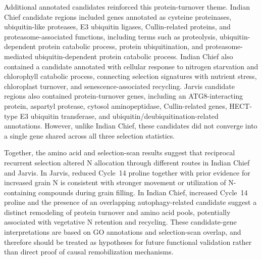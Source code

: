 \documentclass[pdflatex,sn-mathphys-num]{sn-jnl}%
\theoremstyle{thmstyleone}%
\theoremstyle{thmstyletwo}%
\theoremstyle{thmstylethree}%
\begin{document}
Additional annotated candidates reinforced this protein-turnover theme. Indian Chief candidate regions included genes annotated as cysteine proteinases, ubiquitin-like proteases, E3 ubiquitin ligases, Cullin-related proteins, and proteasome-associated functions, including terms such as proteolysis, ubiquitin-dependent protein catabolic process, protein ubiquitination, and proteasome-mediated ubiquitin-dependent protein catabolic process. Indian Chief also contained a candidate annotated with cellular response to nitrogen starvation and chlorophyll catabolic process, connecting selection signatures with nutrient stress, chloroplast turnover, and senescence-associated recycling. Jarvis candidate regions also contained protein-turnover genes, including an ATG8-interacting protein, aspartyl protease, cytosol aminopeptidase, Cullin-related genes, HECT-type E3 ubiquitin transferase, and ubiquitin/deubiquitination-related annotations. However, unlike Indian Chief, these candidates did not converge into a single gene shared across all three selection statistics.

Together, the amino acid and selection-scan results suggest that reciprocal recurrent selection altered N allocation through different routes in Indian Chief and Jarvis. In Jarvis, reduced Cycle~14 proline together with prior evidence for increased grain N is consistent with stronger movement or utilization of N-containing compounds during grain filling. In Indian Chief, increased Cycle~14 proline and the presence of an overlapping autophagy-related candidate suggest a distinct remodeling of protein turnover and amino acid pools, potentially associated with vegetative N retention and recycling. These candidate-gene interpretations are based on GO annotations and selection-scan overlap, and therefore should be treated as hypotheses for future functional validation rather than direct proof of causal remobilization mechanisms.
\end{document}
